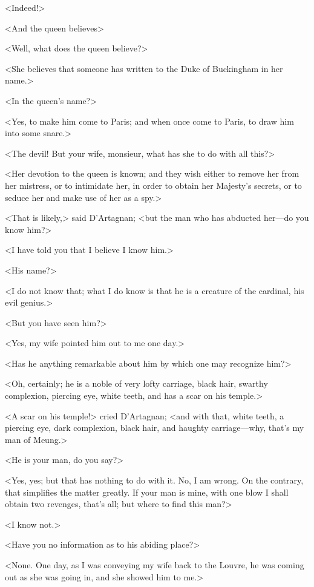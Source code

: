 <Indeed!> 

<And the queen believes\longdash> 

<Well, what does the queen believe?> 

<She believes that someone has written to the Duke of Buckingham in her name.> 

<In the queen's name?> 

<Yes, to make him come to Paris; and when once come to Paris, to draw him into some snare.> 

<The devil! But your wife, monsieur, what has she to do with all this?> 

<Her devotion to the queen is known; and they wish either to remove her from her mistress, or to intimidate her, in order to obtain her Majesty's secrets, or to seduce her and make use of her as a spy.> 

<That is likely,> said D'Artagnan; <but the man who has abducted her—do you know him?> 

<I have told you that I believe I know him.> 

<His name?> 

<I do not know that; what I do know is that he is a creature of the cardinal, his evil genius.> 

<But you have seen him?> 

<Yes, my wife pointed him out to me one day.> 

<Has he anything remarkable about him by which one may recognize him?> 

<Oh, certainly; he is a noble of very lofty carriage, black hair, swarthy complexion, piercing eye, white teeth, and has a scar on his temple.> 

<A scar on his temple!> cried D'Artagnan; <and with that, white teeth, a piercing eye, dark complexion, black hair, and haughty carriage—why, that's my man of Meung.> 

<He is your man, do you say?> 

<Yes, yes; but that has nothing to do with it. No, I am wrong. On the contrary, that simplifies the matter greatly. If your man is mine, with one blow I shall obtain two revenges, that's all; but where to find this man?> 

<I know not.> 

<Have you no information as to his abiding place?> 

<None. One day, as I was conveying my wife back to the Louvre, he was coming out as she was going in, and she showed him to me.> 

